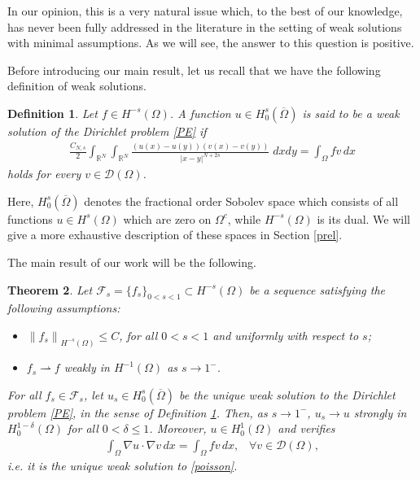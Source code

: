 \documentclass[reqno,twoside]{amsart}
\newtheorem{theorem}{Theorem}[section]
\newtheorem{definition}[theorem]{Definition}
\numberwithin{equation}{section}
\def\RR{{\mathbb{R}}}
\newcommand{\norm}[2]{{\left\|#1\right\|}_{#2}}
\newcommand{\rouge}[1]{{\color{red}#1}}
\begin{document}
In our opinion, this is a very natural issue which, to the best of our knowledge, has never been fully addressed in the literature in the setting of weak solutions with minimal assumptions. As we will see, the answer to this question is positive. 

Before introducing our main result, let us recall that we have the following definition of weak solutions. 

\begin{definition}\label{weak_sol_def}
	Let $f\in H^{-s}(\Omega)$. A function $u\in H_0^s(\overline{\Omega})$ is said to be a weak solution of the Dirichlet problem \eqref{PE} if 
	\begin{align}\label{weak-sol}
	\frac{C_{N,s}}{2}\int_{\RR^N}\int_{\RR^N}\frac{(u(x)-u(y))(v(x)-v(y))}{|x-y|^{N+2s}}\;dxdy = \int_\Omega  fv\,dx
	\end{align}
	holds for every $v\in\mathcal{D}(\Omega)$.
\end{definition}

\rouge{
Here, $H_0^s(\overline{\Omega})$ denotes the fractional order Sobolev space which consists of all functions $u\in H^s(\Omega)$ which are zero on $\Omega^c$, while $H^{-s}(\Omega)$ is its dual. We will give a more exhaustive description of these spaces in Section \ref{prel}.
}

The main result of our work will be the following.

\begin{theorem}\label{limit_thm}
	Let $\mathcal{F}_s=\{f_s\}_{0<s<1}\subset H^{-s}(\Omega)$ be a sequence satisfying the following assumptions:
	\begin{itemize}
		\item[$\textbf{H1}$] $\norm{f_s}{H^{-s}(\Omega)}\leq C$, for all $0<s<1$ and uniformly with respect to $s$;
		
		\item[$\textbf{H2}$] $f_s\rightharpoonup f$ weakly in $H^{-1}(\Omega)$ as $s\to 1^-$.
	\end{itemize}		
	For all $f_s\in\mathcal{F}_s$, let $u_s\in H_0^s(\overline{\Omega})$ be the unique weak solution to the Dirichlet problem \eqref{PE}, in the sense of Definition \ref{weak_sol_def}. Then, as $s\to 1^-$, $u_s\to u$ strongly in $H^{1-\delta}_0(\Omega)$ for all $0<\delta\leq 1$. Moreover, $u\in H^1_0(\Omega)$ and verifies
\begin{align*}
	\int_{\Omega} \nabla u\cdot\nabla v\,dx = \int_{\Omega}fv\,dx, \;\;\; \forall v\in\mathcal{D}(\Omega),
\end{align*}
i.e. it is the unique weak solution to \eqref{poisson}.
\end{theorem}
\end{document}
